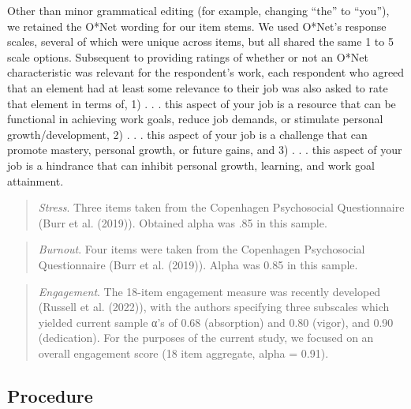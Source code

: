 \documentclass[
  man]{apa6}
\begin{document}
Other than minor grammatical editing (for example, changing ``the'' to ``you''), we retained the O*Net wording for our item stems. We used O*Net's response scales, several of which were unique across items, but all shared the same 1 to 5 scale options. Subsequent to providing ratings of whether or not an O*Net characteristic was relevant for the respondent's work, each respondent who agreed that an element had at least some relevance to their job was also asked to rate that element in terms of, 1) . . . this aspect of your job is a resource that can be functional in achieving work goals, reduce job demands, or stimulate personal growth/development, 2) . . . this aspect of your job is a challenge that can promote mastery, personal growth, or future gains, and 3) . . . this aspect of your job is a hindrance that can inhibit personal growth, learning, and work goal attainment.

\begin{quote}
\emph{Stress}. Three items taken from the Copenhagen Psychosocial Questionnaire (Burr et al. (2019)). Obtained alpha was .85 in this sample.
\end{quote}

\begin{quote}
\emph{Burnout}. Four items were taken from the Copenhagen Psychosocial Questionnaire (Burr et al. (2019)). Alpha was 0.85 in this sample.
\end{quote}

\begin{quote}
\emph{Engagement}. The 18-item engagement measure was recently developed (Russell et al. (2022)), with the authors specifying three subscales which yielded current sample α's of 0.68 (absorption) and 0.80 (vigor), and 0.90 (dedication). For the purposes of the current study, we focused on an overall engagement score (18 item aggregate, alpha = 0.91).
\end{quote}

\hypertarget{procedure}{%
\subsection{Procedure}\label{procedure}}
\end{document}
